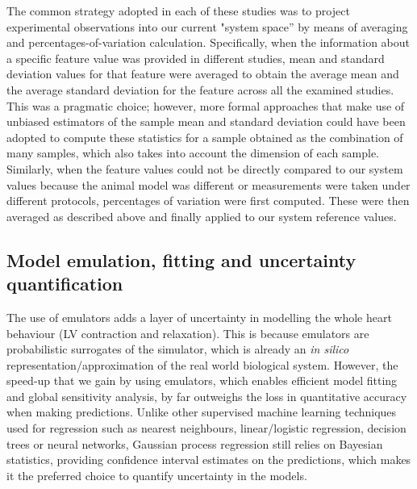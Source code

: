 \vspace{0.2cm}
The common strategy adopted in each of these studies was to project experimental observations into our current "system space'' by means of averaging and percentages-of-variation calculation. Specifically, when the information about a specific feature value was provided in different studies, mean and standard deviation values for that feature were averaged to obtain the average mean and the average standard deviation for the feature across all the examined studies. This was a pragmatic choice; however, more formal approaches that make use of unbiased estimators of the sample mean and standard deviation could have been adopted to compute these statistics for a sample obtained as the combination of many samples, which also takes into account the dimension of each sample. Similarly, when the feature values could not be directly compared to our system values because the animal model was different or measurements were taken under different protocols, percentages of variation were first computed. These were then averaged as described above and finally applied to our system reference values.


%
%
%
\subsection{Model emulation, fitting and uncertainty quantification}\label{sec:ch9model_emulation_fitting_and_uncertainty_quantification}The use of emulators adds a layer of uncertainty in modelling the whole heart behaviour (LV contraction and relaxation). This is because emulators are probabilistic surrogates of the simulator, which is already an \textit{in silico} representation/approximation of the real world biological system. However, the speed-up that we gain by using emulators, which enables efficient model fitting and global sensitivity analysis, by far outweighs the loss in quantitative accuracy when making predictions. Unlike other supervised machine learning techniques used for regression such as nearest neighbours, linear/logistic regression, decision trees or neural networks, Gaussian process regression still relies on Bayesian statistics, providing confidence interval estimates on the predictions, which makes it the preferred choice to quantify uncertainty in the models.

